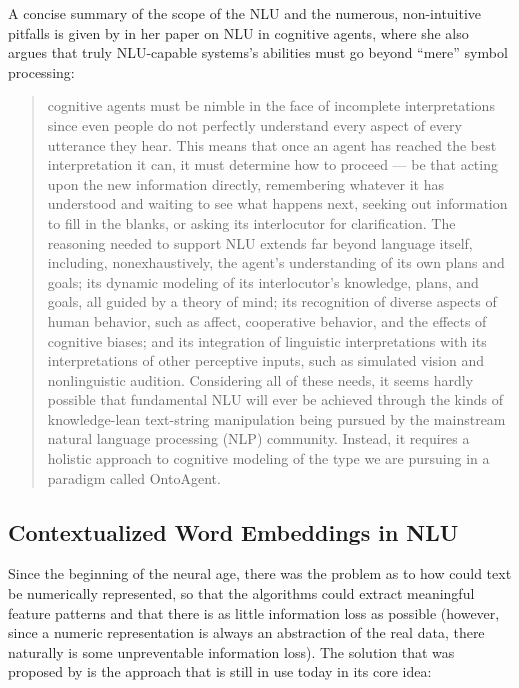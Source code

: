 A concise summary of the scope of the NLU and the numerous, non-intuitive pitfalls is given by
\cite{mcshane2017natural} in her paper on NLU in cognitive agents, where she also argues that
truly NLU-capable systems's abilities must go beyond ``mere'' symbol processing:

\begin{quote}
  cognitive agents must be nimble in the face of incomplete interpretations since even people do not
  perfectly understand every aspect of every utterance they hear. This means that once an agent
  has reached the best interpretation it can, it must determine how to proceed — be that acting
  upon the new information directly, remembering whatever it has understood and waiting to see
  what happens next, seeking out information to fill in the blanks, or asking its interlocutor
  for clarification. The reasoning needed to support NLU extends far beyond language itself,
  including, nonexhaustively, the agent’s understanding of its own plans and goals; its dynamic
  modeling of its interlocutor’s knowledge, plans, and goals, all guided by a theory of mind;
  its recognition of diverse aspects of human behavior, such as affect, cooperative behavior,
  and the effects of cognitive biases; and its integration of linguistic interpretations with
  its interpretations of other perceptive inputs, such as simulated vision and nonlinguistic
  audition. Considering all of these needs, it seems hardly possible that fundamental NLU
  will ever be achieved through the kinds of knowledge-lean text-string manipulation being
  pursued by the mainstream natural language processing (NLP) community. Instead, it requires
  a holistic approach to cognitive modeling of the type we are pursuing in a paradigm called
  OntoAgent.
\end{quote}



\subsection{Contextualized Word Embeddings in NLU}

Since the beginning of the neural age, there was the problem as to how could text be numerically
represented, so that the algorithms could extract meaningful feature patterns and that there
is as little information loss as possible (however, since a numeric representation is always
an abstraction of the real data, there naturally is some unpreventable information loss). The
solution that was proposed by \cite{mikolov2013distributed} is the approach that is still in use
today in its core idea:

